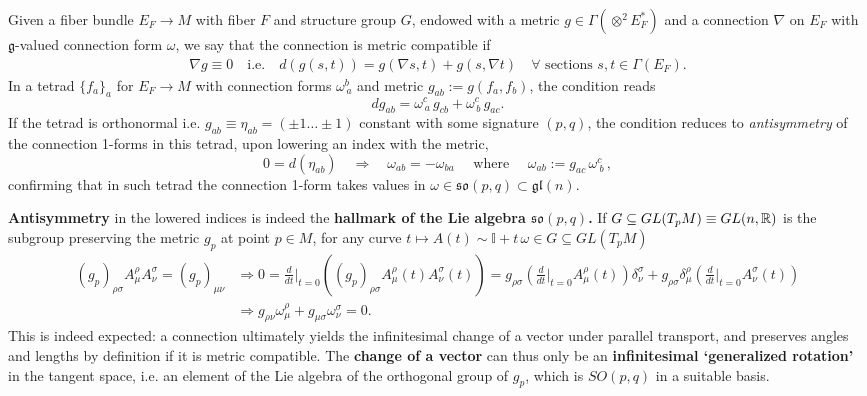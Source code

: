 \documentclass[../geometry_main.tex]{subfiles}
\begin{document}
\begin{mytheorem}
%
Given a fiber bundle $E_F \to M$ with fiber $F$ and structure group $G$, endowed with a metric 
$g\in\Gamma(\otimes^2 E_F^*)$ and a connection $\nabla$ on $E_F$ with $\mathfrak{g}$-valued connection form $\omega$, we say that the connection is metric compatible if 
\begin{align}
    \nabla g \equiv 0\quad \text{i.e.}\quad d \left( g(s,t) \right) = g(\nabla s, t) + g(s, \nabla t)\quad \text{$\forall$ sections }s,t \in \Gamma(E_F).
\end{align}
In a tetrad $\{f_a\}_a$ for $E_F \to M$ with connection forms $\omega_{\,a}^{b}$ and metric $g_{ab} := g(f_a, f_b)$, the condition reads
\begin{equation}
    d g_{ab} = \omega_{\,a}^{c}\, g_{cb} + \omega_{\,b}^{c} \,g_{ac}.
\end{equation}
If the tetrad is orthonormal i.e. $g_{ab} \equiv \eta_{ab}= (\pm1\dots\pm1)$ constant with some signature $(p,q)$, the condition reduces to \emph{antisymmetry} of the connection 1-forms in this tetrad, upon lowering an index with the metric,
\begin{equation}
    0 = d(\eta_{ab})\quad \Rightarrow\quad \omega_{ab} = - \omega_{ba}\quad \text{ where }\quad \omega_{ab} := g_{ac} \, \omega^c_{~b}\,,
\end{equation}
confirming that in such tetrad the connection 1-form takes values in $\omega\in\mathfrak{so}(p,q)\subset \mathfrak{gl}(n)$.

\textbf{Antisymmetry} in the lowered indices is indeed the \textbf{hallmark of the Lie algebra $\mathfrak{so}(p,q)$.}
If $G\subseteq GL(T_pM) \equiv GL(n,\mathbb{R})$ is the subgroup preserving the metric $g_p$ at point $p\in M$, for any curve $t\mapsto A(t)\sim\mathbb{I}+t\,\omega \in G\subseteq GL(T_pM)$
{\small
\begin{align}
    (g_p)_{\rho\sigma}A^\rho_\mu A^\sigma_\nu = (g_p)_{\mu\nu}
    &\Rightarrow 0 = \frac{d}{dt} \Big|_{t=0} \left( (g_p)_{\rho\sigma}A^\rho_\mu(t) A^\sigma_\nu(t) \right) = g_{\rho\sigma} \left( \frac{d}{dt} \Big|_{t=0} A^\rho_\mu(t) \right) \delta^\sigma_\nu + g_{\rho\sigma} \delta^\rho_\mu \left( \frac{d}{dt} \Big|_{t=0} A^\sigma_\nu(t) \right) \\
    &\Rightarrow g_{\rho\nu} \omega^\rho_\mu + g_{\mu\sigma} \omega^\sigma_\nu = 0.
\end{align}
}
This is indeed expected: a connection ultimately yields the infinitesimal change of a vector under parallel transport, and preserves angles and lengths by definition if it is metric compatible.
The \textbf{change of a vector} can thus only be an \textbf{infinitesimal `generalized rotation'} in the tangent space, i.e. an element of the Lie algebra of the orthogonal group of $g_p$, which is $SO(p,q)$ in a suitable basis.
\end{mytheorem}
\end{document}
